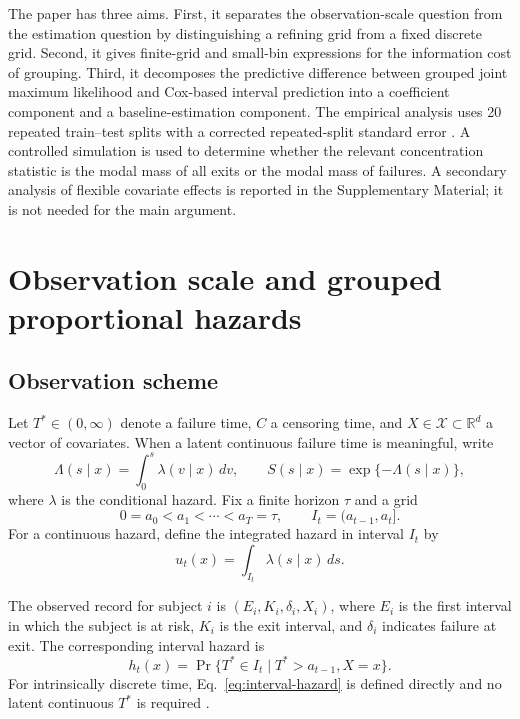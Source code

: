 \documentclass[smallextended,natbib]{svjour3}
\begin{document}
The paper has three aims. First, it separates the observation-scale question from the estimation question by distinguishing a refining grid from a fixed discrete grid. Second, it gives finite-grid and small-bin expressions for the information cost of grouping. Third, it decomposes the predictive difference between grouped joint maximum likelihood and Cox-based interval prediction into a coefficient component and a baseline-estimation component. The empirical analysis uses 20 repeated train--test splits with a corrected repeated-split standard error \citep{nadeau2003}. A controlled simulation is used to determine whether the relevant concentration statistic is the modal mass of all exits or the modal mass of failures. A secondary analysis of flexible covariate effects is reported in the Supplementary Material; it is not needed for the main argument.

\section{Observation scale and grouped proportional hazards}
\label{sec:model}

\subsection{Observation scheme}
\label{sec:observation}

Let $T^\ast\in(0,\infty)$ denote a failure time, $C$ a censoring time, and $X\in\mathcal X\subset\mathbb R^d$ a vector of covariates. When a latent continuous failure time is meaningful, write
\begin{equation}
\Lambda(s\mid x)=\int_0^s\lambda(v\mid x)\,dv,
\qquad
S(s\mid x)=\exp\{-\Lambda(s\mid x)\},
\label{eq:survival}
\end{equation}
where $\lambda$ is the conditional hazard. Fix a finite horizon $\tau$ and a grid
\begin{equation}
0=a_0<a_1<\cdots<a_T=\tau,
\qquad I_t=(a_{t-1},a_t].
\label{eq:grid}
\end{equation}
For a continuous hazard, define the integrated hazard in interval $I_t$ by
\begin{equation}
u_t(x)=\int_{I_t}\lambda(s\mid x)\,ds.
\label{eq:integrated-hazard}
\end{equation}

The observed record for subject $i$ is $(E_i,K_i,\delta_i,X_i)$, where $E_i$ is the first interval in which the subject is at risk, $K_i$ is the exit interval, and $\delta_i$ indicates failure at exit. The corresponding interval hazard is
\begin{equation}
h_t(x)=\Pr\{T^\ast\in I_t\mid T^\ast>a_{t-1},X=x\}.
\label{eq:interval-hazard}
\end{equation}
For intrinsically discrete time, Eq.~\eqref{eq:interval-hazard} is defined directly and no latent continuous $T^\ast$ is required \citep{tutz2016}.
\end{document}
